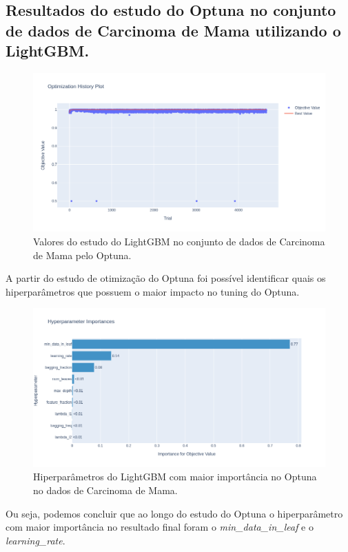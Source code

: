 \subsection{Resultados do estudo do Optuna no conjunto de dados de Carcinoma de Mama utilizando o LightGBM.}
\begin{figure}[H]
 \caption{Valores do estudo do LightGBM no conjunto de dados de Carcinoma de Mama pelo Optuna.}
 \label{fig:op:cancer:trials:lgbm}
 \centering
 \includegraphics[scale=0.4]{images/optuna_lgbm_cancer.png}
\end{figure}
A partir do estudo de otimização do Optuna foi possível identificar quais os hiperparâmetros que possuem o maior impacto no tuning do Optuna.
\begin{figure}[H]
 \caption{Hiperparâmetros do LightGBM com maior importância no Optuna no dados de Carcinoma de Mama.}
 \label{fig:op:cancer:impo:lgbm}
 \centering
 \includegraphics[scale=0.4]{images/optuna_lgbm_importance_cancer.png}
\end{figure}
Ou seja, podemos concluir que ao longo do estudo do Optuna o hiperparâmetro com maior importância no resultado final foram o \textit{min\_data\_in\_leaf} e o \textit{learning\_rate}.

